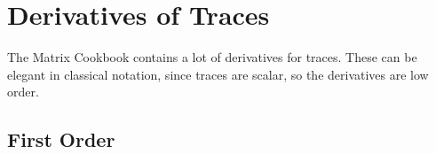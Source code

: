 

\section{Derivatives of Traces}
The Matrix Cookbook contains a lot of derivatives for traces.
These can be elegant in classical notation, since traces are scalar, so the derivatives are low order.


\subsection{First Order}

